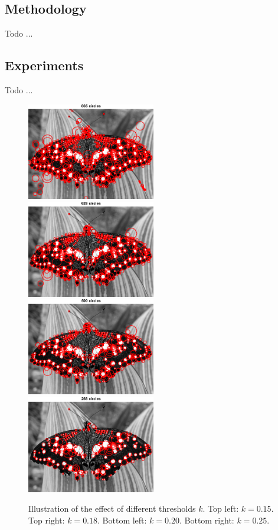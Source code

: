 \documentclass[a4paper,psfig,subfigure,epsfig,fleqn,ausarbeitung,amssmb,float,caption,fontenc]{article}
\begin{document}
\subsection{Methodology}

Todo ...

\subsection{Experiments}

Todo ...

\begin{figure}[h]
	\includegraphics[width=0.5\textwidth]{figures/a3_butterfly_k015.png}
	\includegraphics[width=0.5\textwidth]{figures/a3_butterfly_k018.png}
	\includegraphics[width=0.5\textwidth]{figures/a3_butterfly_k020.png}
	\includegraphics[width=0.5\textwidth]{figures/a3_butterfly_k025.png}
	\caption{Illustration of the effect of different thresholds $k$. Top left: $k=0.15$. Top right: $k=0.18$. Bottom left: $k=0.20$. Bottom right: $k=0.25$.}
\end{figure}
\end{document}
